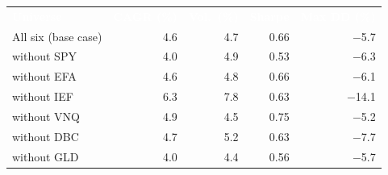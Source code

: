 \begin{tabularx}{\textwidth}{Xrrrr}
\toprule
\rowcolor{fmdark}\textcolor{white}{\textbf{Universe}} & \textcolor{white}{\textbf{CAGR (\%)}} & \textcolor{white}{\textbf{Vol.\ (\%)}} & \textcolor{white}{\textbf{Sharpe}} & \textcolor{white}{\textbf{Max DD (\%)}} \\
All six (base case) & 4.6 & 4.7 & 0.66 & $-$5.7 \\
without SPY & 4.0 & 4.9 & 0.53 & $-$6.3 \\
without EFA & 4.6 & 4.8 & 0.66 & $-$6.1 \\
without IEF & 6.3 & 7.8 & 0.63 & $-$14.1 \\
without VNQ & 4.9 & 4.5 & 0.75 & $-$5.2 \\
without DBC & 4.7 & 5.2 & 0.63 & $-$7.7 \\
without GLD & 4.0 & 4.4 & 0.56 & $-$5.7 \\
\bottomrule
\end{tabularx}
